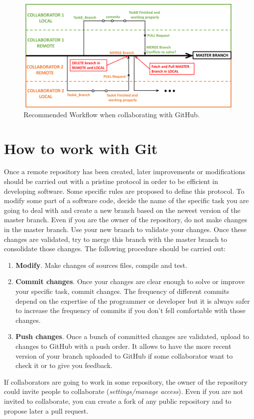 \begin{figure}[h]
    \centering
    \includegraphics[width = \textwidth]{Figures/WorkFlowGit.png}
    \caption{Recommended Workflow when collaborating with GitHub.}
    \label{fig:WorFlowGit}
\end{figure} 
  



\section{How to work with Git}
Once a remote repository has been created, later improvements or modifications 
should be carried out with a pristine protocol in order to be efficient in developing
software. Some specific rules are proposed to define this protocol.
To modify some part of a software code, decide the name of the specific 
task you are going to deal with and create a new branch based on the newest version of 
the master branch. Even if you are the owner of the repository,
do not make changes in the master branch. 
Use your new branch to validate your changes. 
Once these changes are validated, try to merge this branch with the master branch to 
consolidate those changes.
The following procedure should be carried out: 
 \begin{enumerate}
 \item {\bf Modify}. Make changes of sources files, compile and test. 
 \item { \bf Commit changes}.  Once your changes are clear enough to solve or 
 improve your specific task, commit changes. 
 The frequency of different commits depend on the expertise of the programmer or developer 
 but it is always safer to increase the frequency of commits if you don't fell comfortable 
 with those changes.  
 \item {\bf Push changes}.
 Once a bunch of committed changes are validated, upload to changes to GitHub 
 with a push order. It allows to have the more recent version of your branch
 uploaded to GitHub if some collaborator want to check it or to give you feedback. 

 \end{enumerate}
If collaborators are going to work in some repository, the owner of the repository
could invite people to collaborate  (\textit{settings/manage access}).
Even if you are not invited to collaborate, you can create a fork of any public repository 
and to propose later a pull request.  
 
